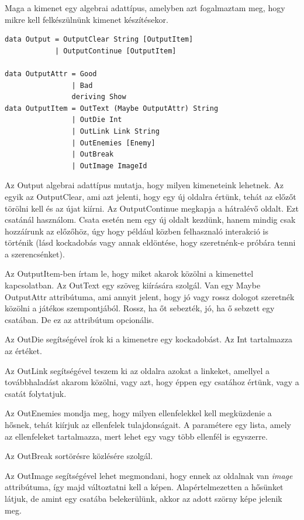 \documentclass[12pt,a4paper,oneside]{report}
\newcommand{\dt}[1]{{\color{State}#1}}
\newcommand{\attr}{\emph}
\begin{document}
      Maga a kimenet egy algebrai adattípus, amelyben azt fogalmaztam
      meg, hogy mikre kell felkészülnünk kimenet készítésekor.
      \begin{verbatim}
data Output = OutputClear String [OutputItem]
            | OutputContinue [OutputItem]

data OutputAttr = Good
                | Bad
                deriving Show
data OutputItem = OutText (Maybe OutputAttr) String
                | OutDie Int
                | OutLink Link String
                | OutEnemies [Enemy]
                | OutBreak
                | OutImage ImageId

      \end{verbatim}
      Az \dt{Output} algebrai adattípus mutatja, hogy milyen kimeneteink
      lehetnek. Az egyik az \dt{OutputClear}, ami azt jelenti, hogy egy új
      oldalra értünk, tehát az előzőt törölni kell és az újat
      kiírni. Az \dt{OutputContinue} megkapja a hátralévő oldalt. Ezt
      csatánál használom. Csata esetén nem egy új oldalt kezdünk,
      hanem mindig csak hozzáírunk az előzőhöz, úgy hogy például közben
      felhasznaló interakció is történik (lásd kockadobás vagy annak
      eldöntése, hogy szeretnénk-e próbára tenni a szerencsénket).
      
      Az \dt{OutputItem}-ben írtam le, hogy miket akarok közölni a
      kimenettel kapcsolatban. Az \dt{OutText} egy szöveg kiírására
      szolgál. Van egy Maybe \dt{OutputAttr} attribútuma, ami annyit
      jelent, hogy jó vagy rossz dologot szeretnék közölni a játékos
      szempontjából. Rossz, ha őt sebezték, jó, ha ő sebzett egy
      csatában. De ez az attribútum opcionális.

      Az \dt{OutDie} segítségével írok ki a kimenetre egy kockadobást. Az
      Int tartalmazza az értéket.

      Az \dt{OutLink} segítségével teszem ki az oldalra azokat a linkeket,
      amellyel a továbbhaladást akarom közölni, vagy azt, hogy éppen
      egy csatához értünk, vagy a csatát folytatjuk.

      Az \dt{OutEnemies} mondja meg, hogy milyen ellenfelekkel kell
      megküzdenie a hősnek, tehát kiírjuk az ellenfelek
      tulajdonságait. A paramétere egy lista, amely az ellenfeleket
      tartalmazza, mert lehet egy vagy több ellenfél is egyszerre.

      Az \dt{OutBreak} sortörésre közlésére szolgál.

      Az \dt{OutImage} segítségével lehet megmondani, hogy ennek az
      oldalnak van \attr{image} attribútuma, így majd változtatni kell a
      képen. Alapértelmezetten a hősünket látjuk, de amint egy csatába
      belekerülünk, akkor az adott szörny képe jelenik meg.
\end{document}
